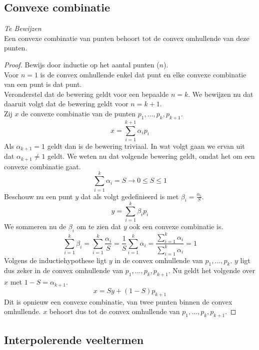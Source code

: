 \documentclass[computergesteund_ontwerp_van_curven_en_oppervlakken.tex]{subfiles}
\begin{document}
\subsection{Convexe combinatie}
\label{convexe_combinatie}
\textit{Te Bewijzen}\\
Een convexe combinatie van punten behoort tot de convex omhullende van deze punten.
\begin{proof}
Bewijs door inductie op het aantal punten ($n$).\\
Voor $n=1$ is de convex omhullende enkel dat punt en elke convexe combinatie van een punt is dat punt.\\
Veronderstel dat de bewering geldt voor een bepaalde $n=k$. We bewijzen nu dat daaruit volgt dat de bewering geldt voor $n=k+1$.\\
Zij $x$ de convexe combinatie van de punten $p_1,...,p_k,p_{k+1}$.
\[
x = \sum_{i=1}^{k+1}\alpha_ip_i
\]
Als $\alpha_{k+1} = 1$ geldt dan is de bewering triviaal. In wat volgt gaan we ervan uit dat $\alpha_{k+1} \neq 1$ geldt.
We weten nu dat volgende bewering geldt, omdat het om een convexe combinatie gaat.
\[
\sum_{i=1}^{k}\alpha_i = S \rightarrow 0 \le S \le 1
\]
Beschouw nu een punt $y$ dat als volgt gedefinieerd is met $\beta_i = \frac{\alpha_i}{S}$.
\[
y = \sum_{i=1}^k\beta_{i}p_{i}
\]
We sommeren nu de $\beta_i$ om te zien dat $y$ ook een convexe combinatie is.
\[
\sum_{i=1}^k\beta_{i} = \sum_{i=1}^k \frac{\alpha_i}{S} = \frac{1}{S}\sum_{i=1}^k \alpha_i = \frac{\sum_{i=1}^{k}\alpha_i}{\sum_{i=1}^{k}\alpha_i} = 1
\]
Volgens de inductiehypothese ligt $y$ in de convex omhullende van $p_1,...,p_k$. $y$ ligt dus zeker in de convex omhullende van $p_1,...,p_k,p_{k+1}$. Nu geldt het volgende over $x$ met $1-S = \alpha_{k+1}$.
\[
x = Sy + (1-S)p_{k+1}
\]
Dit is opnieuw een convexe combinatie, van twee punten binnen de convex omhullende. $x$ behoort dus tot de convex omhullende van $p_1,...,p_k,p_{k+1}$. 
\end{proof}

\subsection{Interpolerende veeltermen}
\end{document}
